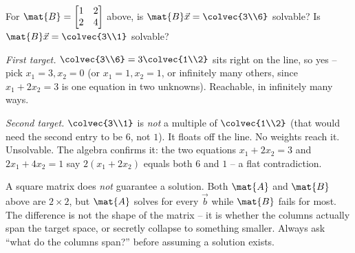 \begin{example}\label{ch03:ex-solvable}
For $\mat{B}=\begin{bmatrix}1&2\\2&4\end{bmatrix}$ above, is $\mat{B}\vec{x}=\colvec{3\\6}$ solvable? Is $\mat{B}\vec{x}=\colvec{3\\1}$ solvable?

\emph{First target.} $\colvec{3\\6} = 3\colvec{1\\2}$ sits right on the line, so yes -- pick $x_1=3, x_2=0$ (or $x_1=1,x_2=1$, or infinitely many others, since $x_1+2x_2=3$ is one equation in two unknowns). Reachable, in infinitely many ways.

\emph{Second target.} $\colvec{3\\1}$ is \emph{not} a multiple of $\colvec{1\\2}$ (that would need the second entry to be $6$, not $1$). It floats off the line. No weights reach it. Unsolvable. The algebra confirms it: the two equations $x_1+2x_2=3$ and $2x_1+4x_2=1$ say $2(x_1+2x_2)$ equals both $6$ and $1$ -- a flat contradiction.
\end{example}

\begin{trapbox}
A square matrix does \emph{not} guarantee a solution. Both $\mat{A}$ and $\mat{B}$ above are $2\times 2$, but $\mat{A}$ solves for every $\vec{b}$ while $\mat{B}$ fails for most. The difference is not the shape of the matrix -- it is whether the columns actually span the target space, or secretly collapse to something smaller. Always ask ``what do the columns span?'' before assuming a solution exists.
\end{trapbox}


